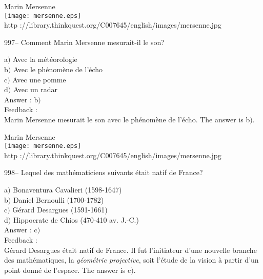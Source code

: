 ﻿\documentclass[letterpaper, 12pt]{article}
\begin{document}
        \begin{center}
        Marin Mersenne\\
    \texttt{[image: mersenne.eps]}\\
        {\footnotesize http
://library.thinkquest.org/C007645/english/images/mersenne.jpg}
    \end{center}

997-- Comment Marin Mersenne mesurait-il le son?

a$)$ Avec la m\'et\'eorologie \\
b$)$ Avec le ph\'enom\`ene de l'\'echo \\
c$)$ Avec une pomme \\
d$)$ Avec un radar\\

Answer : b$)$\\

Feedback : \\
Marin Mersenne mesurait le son avec le ph\'enom\`ene de l'\'echo.
The answer is b$)$.\\

        \begin{center}
        Marin Mersenne\\
    \texttt{[image: mersenne.eps]}\\
        {\footnotesize http
://library.thinkquest.org/C007645/english/images/mersenne.jpg}
    \end{center}

998-- Lequel des math\'ematiciens suivants \'etait natif de France?

a$)$ Bonaventura Cavalieri (1598-1647) \\
b$)$ Daniel Bernoulli (1700-1782) \\
c$)$ G\'erard Desargues (1591-1661) \\
d$)$ Hippocrate de Chios (470-410 av. J.-C.)\\

Answer : c$)$\\

Feedback : \\
G\'erard Desargues \'etait natif de France. Il fut l'initiateur
d'une nouvelle branche des math\'ematiques, la {\sl g\'eom\'etrie
projective}, soit l'\'etude de la vision \`a partir d'un point
donn\'e de l'espace.
The answer is c$)$.\\

\end{document}
